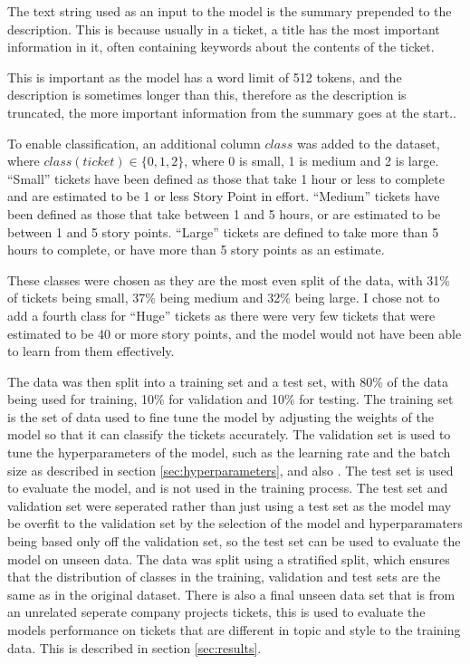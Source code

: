 \documentclass{UoYCSproject}
\begin{document}
    The text string used as an input to the model is the summary prepended to the description.
    This is because usually in a ticket, a title has the most important information in it, often containing keywords about the contents of the ticket. \par
    This is important as the model has a word limit of 512 tokens, and the description is sometimes longer than this, therefore as the description is truncated, the more important information from the summary goes at the start..

    To enable classification, an additional column $class$ was added to the dataset, where $class(ticket) \in \{0,1,2\}$, where 0 is small, 1 is medium and 2 is large.
    ``Small'' tickets have been defined as those that take 1 hour or less to complete and are estimated to be 1 or less Story Point in effort.
    ``Medium'' tickets have been defined as those that take between 1 and 5 hours, or are estimated to be between 1 and 5 story points.
    ``Large'' tickets are defined to take more than 5 hours to complete, or have more than 5 story points as an estimate.

    These classes were chosen as they are the most even split of the data, with 31\% of tickets being small, 37\% being medium and 32\% being large. I chose not to add a fourth class for ``Huge'' tickets as there were very few tickets that were estimated to be 40 or more story points, and the model would not have been able to learn from them effectively.

    The data was then split into a training set and a test set, with 80\% of the data being used for training, 10\% for validation and 10\% for testing.
    The training set is the set of data used to fine tune the model by adjusting the weights of the model so that it can classify the tickets accurately.
    The validation set is used to tune the hyperparameters of the model, such as the learning rate and the batch size as described in section \ref{sec:hyperparameters}, and also .
    The test set is used to evaluate the model, and is not used in the training process.
    The test set and validation set were seperated rather than just using a test set as the model may be overfit to the validation set by the selection of the model and hyperparamaters being based only off the validation set, so the test set can be used to evaluate the model on unseen data.
    The data was split using a stratified split, which ensures that the distribution of classes in the training, validation and test sets are the same as in the original dataset.
    There is also a final unseen data set that is from an unrelated seperate company projects tickets, this is used to evaluate the models performance on tickets that are different in topic and style to the training data. This is described in section \ref{sec:results}.
\end{document}
